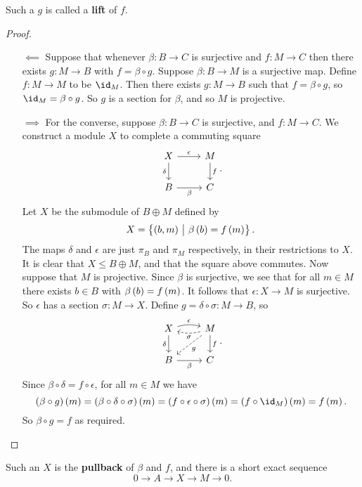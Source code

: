 Such a $ g $ is called a \textbf{lift} of $ f $.

\begin{proof}
\hfill
\begin{itemize}
\item[$ \impliedby $] Suppose that whenever $ \beta : B \to C $ is surjective and $ f : M \to C $ then there exists $ g : M \to B $ with $ f = \beta \circ g $. Suppose $ \beta : B \to M $ is a surjective map. Define $ f : M \to M $ to be $ \id_M $. Then there exists $ g : M \to B $ such that $ f = \beta \circ g $, so $ \id_M = \beta \circ g $. So $ g $ is a section for $ \beta $, and so $ M $ is projective.
\item[$ \implies $] For the converse, suppose $ \beta : B \to C $ is surjective, and $ f : M \to C $. We construct a module $ X $ to complete a commuting square
$$
\begin{tikzcd}
X \arrow{r}{\epsilon} \arrow[swap]{d}{\delta} & M \arrow{d}{f} \\
B \arrow[swap]{r}{\beta} & C
\end{tikzcd}.
$$
Let $ X $ be the submodule of $ B \oplus M $ defined by
$$ X = \cbr{\br{b, m} \st \beta\br{b} = f\br{m}}. $$
The maps $ \delta $ and $ \epsilon $ are just $ \pi_B $ and $ \pi_M $ respectively, in their restrictions to $ X $. It is clear that $ X \le B \oplus M $, and that the square above commutes. Now suppose that $ M $ is projective. Since $ \beta $ is surjective, we see that for all $ m \in M $ there exists $ b \in B $ with $ \beta\br{b} = f\br{m} $. It follows that $ \epsilon : X \to M $ is surjective. So $ \epsilon $ has a section $ \sigma : M \to X $. Define $ g = \delta \circ \sigma : M \to B $, so
$$
\begin{tikzcd}
X \arrow[bend left=15]{r}{\epsilon} \arrow[swap]{d}{\delta} & M \arrow[bend left=15, dashed]{l}{\sigma} \arrow[dashed]{dl}{g} \arrow{d}{f} \\
B \arrow[swap]{r}{\beta} & C
\end{tikzcd}.
$$
Since $ \beta \circ \delta = f \circ \epsilon $, for all $ m \in M $ we have
$$ \br{\beta \circ g}\br{m} = \br{\beta \circ \delta \circ \sigma}\br{m} = \br{f \circ \epsilon \circ \sigma}\br{m} = \br{f \circ \id_M}\br{m} = f\br{m}. $$
So $ \beta \circ g = f $ as required.
\end{itemize}
\end{proof}

\pagebreak

Such an $ X $ is the \textbf{pullback} of $ \beta $ and $ f $, and there is a short exact sequence
$$ 0 \to A \to X \to M \to 0. $$

